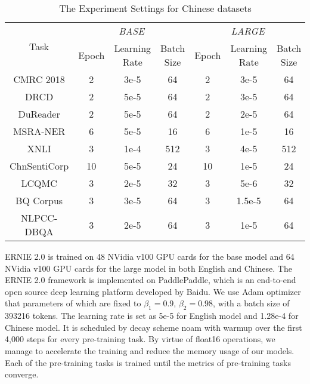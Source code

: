 \documentclass[letterpaper]{article} \usepackage{aaai20}  \usepackage{times}  \usepackage{helvet} \usepackage{courier}  \usepackage[hyphens]{url}  \usepackage{graphicx} \usepackage{makecell}
\begin{document}
\begin{table}[htbp]
\small
\begin{center}
\resizebox{0.45\textwidth}{!}
{
\begin{tabular}{@{}c|ccc|ccc@{}}
  \hline \hline
   \multirow{2}{*}{Task}      &  \multicolumn{3}{c|}{\textit{BASE}} & \multicolumn{3}{c}{\textit{LARGE}} \\ \cline{2-7}
                &  Epoch & \makecell{Learning \\ Rate} & \makecell{Batch \\ Size} &  Epoch & \makecell{Learning \\Rate}  & \makecell{Batch \\ Size} \\ \hline 
  CMRC 2018  & 2 & 3e-5 & 64 & 2 & 3e-5 & 64 \\
  DRCD  & 2 & 5e-5 & 64 & 2 & 3e-5 & 64 \\
  DuReader  & 2 & 5e-5 & 64 & 2 & 2e-5 & 64 \\
  MSRA-NER  & 6 & 5e-5 & 16    & 6 & 1e-5 & 16 \\
  XNLI  & 3 & 1e-4 &  512 & 3 & 4e-5 & 512  \\
  ChnSentiCorp  & 10 & 5e-5 & 24  & 10 & 1e-5 & 24  \\
  LCQMC  & 3 & 2e-5 & 32  & 3 & 5e-6 & 32  \\
  BQ Corpus  & 3 & 3e-5 & 64  & 3 & 1.5e-5 & 64  \\
  NLPCC-DBQA  & 3 & 2e-5 & 64 & 3 & 1e-5 & 64 \\
\hline \hline
\end{tabular}

} \end{center}
\caption{The Experiment Settings for Chinese datasets}
\label{chinese_finetune_setting}
\end{table}


ERNIE 2.0 is trained on 48 NVidia v100 GPU cards for the base model and 64 NVidia v100 GPU cards for the large model in both English and Chinese. The ERNIE 2.0 framework is implemented on PaddlePaddle, which is an end-to-end open source deep learning platform developed by Baidu. We use Adam optimizer that parameters of which are fixed to $\beta_1=0.9$, $\beta_2=0.98$, with a batch size of 393216 tokens. The learning rate is set as 5e-5 for English model and 1.28e-4 for Chinese model. It is scheduled by decay scheme noam \cite{vaswani2017attention} with warmup over the first 4,000 steps for every pre-training task. By virtue of float16 operations, we manage to accelerate the training and reduce the memory usage of our models. Each of the pre-training tasks is trained until the metrics of pre-training tasks converge. 
\end{document}
